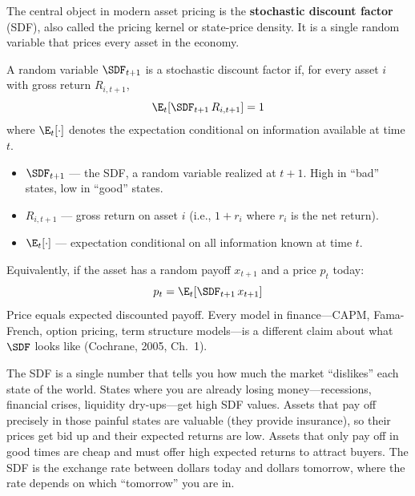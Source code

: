 The central object in modern asset pricing is the \textbf{stochastic discount factor} (SDF), also called the pricing kernel or state-price density. It is a single random variable that prices every asset in the economy.

\begin{definition}
A random variable $\SDF_{t+1}$ is a stochastic discount factor if, for every asset $i$ with gross return $R_{i,t+1}$,
\begin{equation}
\E_t[\SDF_{t+1} \, R_{i,t+1}] = 1
\label{eq:sdf-basic}
\end{equation}
where $\E_t[\cdot]$ denotes the expectation conditional on information available at time $t$.
\begin{itemize}[nosep]
  \item $\SDF_{t+1}$ --- the SDF, a random variable realized at $t+1$. High in ``bad'' states, low in ``good'' states.
  \item $R_{i,t+1}$ --- gross return on asset $i$ (i.e., $1 + r_i$ where $r_i$ is the net return).
  \item $\E_t[\cdot]$ --- expectation conditional on all information known at time $t$.
\end{itemize}
\end{definition}

Equivalently, if the asset has a random payoff $x_{t+1}$ and a price $p_t$ today:
\begin{equation}
p_t = \E_t[\SDF_{t+1} \, x_{t+1}]
\label{eq:sdf-payoff}
\end{equation}
Price equals expected discounted payoff. Every model in finance---CAPM, Fama-French, option pricing, term structure models---is a different claim about what $\SDF$ looks like (Cochrane, 2005, Ch.~1).

\begin{intuition}
The SDF is a single number that tells you how much the market ``dislikes'' each state of the world. States where you are already losing money---recessions, financial crises, liquidity dry-ups---get high SDF values. Assets that pay off precisely in those painful states are valuable (they provide insurance), so their prices get bid up and their expected returns are low. Assets that only pay off in good times are cheap and must offer high expected returns to attract buyers. The SDF is the exchange rate between dollars today and dollars tomorrow, where the rate depends on which ``tomorrow'' you are in.
\end{intuition}

